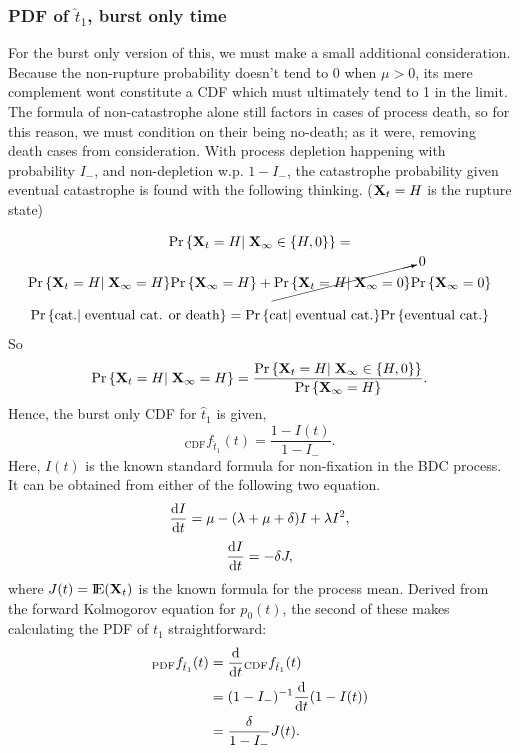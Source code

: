 \subsubsection*{PDF of $\hat t_1$, burst only time}
For the burst only version of this, we must make a small additional consideration. Because the non-rupture probability doesn't tend to 0 when $\mu >0$, its mere complement wont constitute a CDF which must ultimately tend to 1 in the limit. The formula of non-catastrophe alone still factors in cases of process death, so for this reason, we must condition on their being no-death; as it were, removing death cases from consideration. With process depletion happening with probability $I_-$, and non-depletion w.p. $1-I_-$, the catastrophe probability given eventual catastrophe is found with the following thinking. (${{\bf X}_t} = H$ is the rupture state)



\begin{multline*}
{\text{Pr}\left\{{{\bf X}_t}= H | \;{\bf X}_{\infty} \in \{ H, 0\}\right\}} =\\ {\text{Pr}\left\{{{\bf X}_t}=H| \;{\bf X}_{\infty} = H\right\}}{\text{Pr}\left\{{\bf X}_{\infty} = H\right\}} + \cancelto{0}{{\text{Pr}\left\{{{\bf X}_t} = H| \;{\bf X}_{\infty} = 0\right\}}}{\text{Pr}\left\{{\bf X}_{\infty} = 0\right\}}
\end{multline*}


$${\text{Pr}\left\{\text{cat.}|\; \text{eventual cat. or death}\right\}} = {\text{Pr}\left\{\text{cat}|\;\text{eventual cat.}\right\}}{\text{Pr}\left\{\text{eventual cat.}\right\}}$$
So 
$${\text{Pr}\left\{{{\bf X}_t}=H| \;{\bf X}_{\infty} = H\right\}} = \frac{{\text{Pr}\left\{{{\bf X}_t} = H | \;{\bf X}_{\infty} \in \{ H, 0\}\right\}} }{{\text{Pr}\left\{{\bf X}_{\infty} = H\right\}} }.$$
Hence, the burst only CDF for $\hat t_1$ is given,
$$_{\text{CDF}}f_{\hat t_1}(t) = \frac{1-I(t)}{1-I_-}.$$
Here, $I(t)$ is the known standard formula for non-fixation in the BDC process. It can be obtained from either of the following two equation. 
$$\displaystyle\frac{{\rm d} I}{{\rm d} t} = \mu - (\lambda+\mu+\delta) I + \lambda I^2,$$
$$\displaystyle\frac{{\rm d} I}{{\rm d} t} = - \delta J,$$
where $J(t) = {\rm I}\!{\rm E}({{\bf X}_t})$ is the known formula for the process mean. Derived from the forward Kolmogorov equation for $p_0(t)$, the second of these makes calculating the PDF of $t_1$ straightforward: 
\begin{align*}
_{\text{PDF}}f_{\hat t_1}(t) &= \displaystyle\frac{{\rm d} }{{\rm d} t}{ _{\text{CDF}}f_{\hat t_1}(t)}\\
&= (1-I_-)^{-1} \displaystyle\frac{{\rm d} }{{\rm d} t} (1-I(t))\\
&= \frac{\delta} {1-I_-}J(t).
\end{align*}


